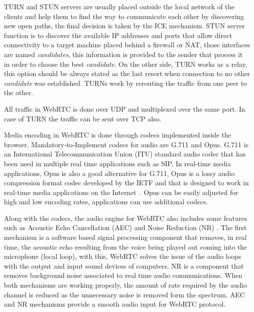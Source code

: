 TURN and STUN servers are usually placed outside the local network of the clients and help them to find the way to communicate each other by discovering new open paths, the final decision is taken by the ICE mechanism. STUN server function is to discover the available IP addresses and ports that allow direct connectivity to a target machine placed behind a firewall or NAT, those interfaces are named {\it candidates}, this information is provided to the sender that process it in order to choose the best {\it candidate}. On the other side, TURN works as a relay, this option should be always stated as the last resort when connection to no other {\it candidate} was established. TURNs work by rerouting the traffic from one peer to the other. 

All traffic in WebRTC is done over UDP and multiplexed over the same port. In case of TURN the traffic can be sent over TCP also.

Media encoding in WebRTC is done through codecs implemented inside the browser. Mandatory-to-Implement codecs for audio are G.711 and Opus. G.711 is an International Telecommunication Union (ITU)  standard audio codec that has been used in multiple real time applications such as SIP. In real-time media applications, Opus is also a good alternative for G.711, Opus is a lossy audio compression format codec developed by the IETF and that is designed to work in real-time media applications on the Internet~\cite{opusIETF}. Opus can be easily adjusted for high and low encoding rates, applications can use additional codecs.

Along with the codecs, the audio engine for WebRTC also includes some features such as Acoustic Echo Cancellation (AEC)  and Noise Reduction (NR) . The first mechanism is a software based signal processing component that removes, in real time, the acoustic echo resulting from the voice being played out coming into the microphone (local loop), with this, WebRTC solves the issue of the audio loops with the output and input sound devices of computers. NR is a component that removes background noise associated to real time audio communications. When both mechanisms are working properly, the amount of rate required by the audio channel is reduced as the unnecessary noise is removed form the spectrum. AEC and NR mechanisms provide a smooth audio input for WebRTC protocol.

